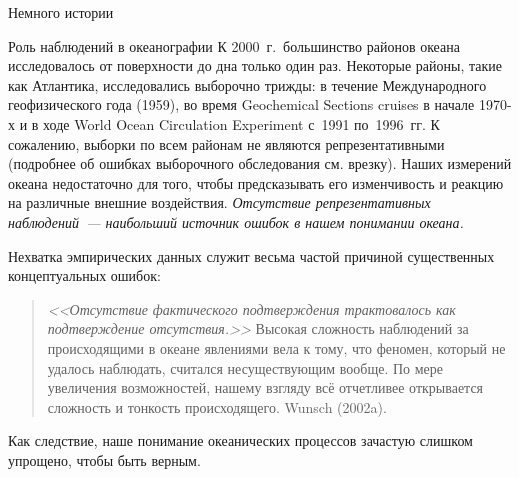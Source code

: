 \begin{chapter}{Немного истории}
\begin{section}{Роль наблюдений в океанографии}
К 2000~г.\ большинство районов океана исследовалось от поверхности до
дна только один раз. Некоторые районы, такие как Атлантика,
исследовались выборочно трижды:
в течение Международного геофизического года (1959), 
во время Geochemical Sections cruises в начале 1970-х
и в ходе World Ocean Circulation Experiment с~1991 по~1996~гг. 
К сожалению, выборки по всем районам не являются репрезентативными 
(подробнее об ошибках выборочного обследования см. врезку).
Наших измерений океана недостаточно для того, чтобы предсказывать его 
изменчивость и реакцию на различные внешние воздействия.
\emph{Отсутствие репрезентативных наблюдений~--- наибольший источник
ошибок в нашем понимании океана.}
%

Нехватка эмпирических данных служит весьма частой причиной существенных
концептуальных ошибок: 
\begin{quote}
\emph{<<Отсутствие фактического подтверждения трактовалось как подтверждение 
отсутствия.>>} Высокая сложность наблюдений за происходящими в океане явлениями
вела к тому, что феномен, который не удалось наблюдать, считался несуществующим
вообще. По мере увеличения возможностей, нашему взгляду всё отчетливее 
открывается сложность и тонкость происходящего. Wunsch (2002a).
\end{quote}
Как следствие, наше понимание океанических процессов зачастую слишком упрощено,
чтобы быть верным.
%


\end{section}
\end{chapter}
